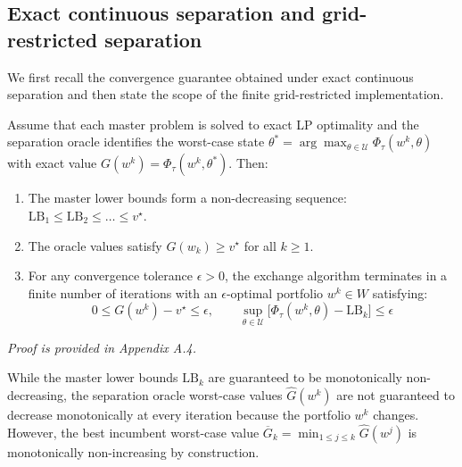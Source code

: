 \documentclass[smallextended]{svjour3}
\begin{document}
\subsection{Exact continuous separation and grid-restricted separation}
We first recall the convergence guarantee obtained under exact continuous separation and then state the scope of the finite grid-restricted implementation.

\begin{proposition}
Assume that each master problem is solved to exact LP optimality and the separation oracle identifies the worst-case state $\theta^* = \arg\max_{\theta \in \mathcal{U}} \Phi_\tau(w^k, \theta)$ with exact value $G(w^k) = \Phi_\tau(w^k, \theta^*)$. Then:
\begin{enumerate}
    \item The master lower bounds form a non-decreasing sequence: $\mathrm{LB}_1 \le \mathrm{LB}_2 \le \dots \le v^\star$.
    \item The oracle values satisfy $G(w_k) \ge v^\star$ for all $k \ge 1$.
    \item For any convergence tolerance $\epsilon > 0$, the exchange algorithm terminates in a finite number of iterations with an $\epsilon$-optimal portfolio $w^k \in W$ satisfying:
    \begin{equation}
        0 \le G(w^k) - v^\star \le \epsilon, \qquad \sup_{\theta \in \mathcal{U}} \bigl[\Phi_\tau(w^k, \theta) - \mathrm{LB}_k\bigr] \le \epsilon
    \end{equation}
\end{enumerate}
\end{proposition}

\textit{Proof is provided in Appendix A.4.}


\begin{remark}
While the master lower bounds $\mathrm{LB}_k$ are guaranteed to be monotonically non-decreasing, the separation oracle worst-case values $\widehat{G}(w^k)$ are not guaranteed to decrease monotonically at every iteration because the portfolio $w^k$ changes. However, the best incumbent worst-case value $\overline{G}_k = \min_{1 \le j \le k} \widehat{G}(w^j)$ is monotonically non-increasing by construction.
\end{remark}
\end{document}
